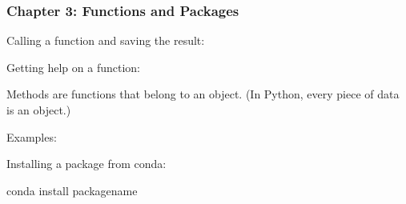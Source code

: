 \documentclass[letterpaper,10pt,english]{jupyterBook}
\begin{document}
\subsubsection{Chapter 3: Functions and Packages}
\label{\detokenize{big-cheat-sheet:chapter-3-functions-and-packages}}
\sphinxAtStartPar
Calling a function and saving the result:

\begin{sphinxVerbatim}[commandchars=\\\{\}]
    
\end{sphinxVerbatim}

\sphinxAtStartPar
Getting help on a function:

\begin{sphinxVerbatim}[commandchars=\\\{\}]
  
\end{sphinxVerbatim}

\sphinxAtStartPar
Methods are functions that belong to an object.  (In Python, every piece of data is an object.)

\sphinxAtStartPar
Examples:

\begin{sphinxVerbatim}[commandchars=\\\{\}]
  
             
               
  \PYG{p}{[}    \PYG{p}{]}
    
\end{sphinxVerbatim}

\sphinxAtStartPar
Installing a package from conda:

\begin{sphinxVerbatim}[commandchars=\\\{\}]
conda install package\PYGZus{}name
\end{sphinxVerbatim}
\end{document}
